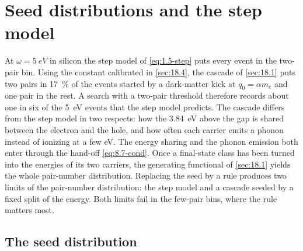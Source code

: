 \section{Seed distributions and the step model}\label{sec:18.3}

At $\omega = \SI{5}{eV}$ in silicon the step model of \cref{eq:1.5-step} puts every event in the two-pair bin. Using the constant calibrated in \cref{sec:18.4}, the cascade of \cref{sec:18.1} puts two pairs in \SI{17}{\percent} of the events started by a dark-matter kick at $q_0 = \alpha m_e$ and one pair in the rest. A search with a two-pair threshold therefore records about one in six of the \SI{5}{eV} events that the step model predicts. The cascade differs from the step model in two respects: how the \SI{3.84}{eV} above the gap is shared between the electron and the hole, and how often each carrier emits a phonon instead of ionizing at a few eV. The energy sharing and the phonon emission both enter through the hand-off \cref{eq:8.7-cond}. Once a final-state class has been turned into the energies of its two carriers, the generating functional of \cref{sec:18.1} yields the whole pair-number distribution. Replacing the seed by a rule produces two limits of the pair-number distribution: the step model and a cascade seeded by a fixed split of the energy. Both limits fail in the few-pair bins, where the rule matters most.

\subsection{The seed distribution}\label{sec:18.3-seed}


